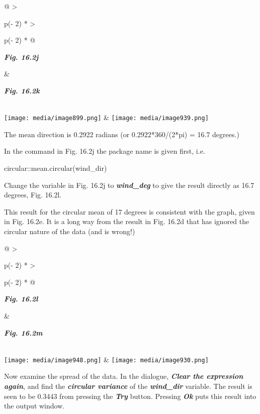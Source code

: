 \documentclass[
  letterpaper,
  DIV=11,
  numbers=noendperiod]{scrreprt}
\begin{document}
\begin{longtable}[]{@{}
  >{\raggedright\arraybackslash}p{(\columnwidth - 2\tabcolsep) * }
  >{\raggedright\arraybackslash}p{(\columnwidth - 2\tabcolsep) * }@{}}
\toprule\noalign{}
\begin{minipage}[b]{\linewidth}\raggedright
\textbf{\emph{Fig. 16.2j}}
\end{minipage} & \begin{minipage}[b]{\linewidth}\raggedright
\textbf{\emph{Fig. 16.2k}}
\end{minipage} \\
\midrule\noalign{}
\endhead
\bottomrule\noalign{}
\endlastfoot
\texttt{[image: media/image899.png]} &
\texttt{[image: media/image939.png]} \\
\end{longtable}

The mean direction is 0.2922 radians (or 0.2922*360/(2*pi) = 16.7
degrees.)

In the command in Fig. 16.2j the package name is given first, i.e.

circular::mean.circular(wind\_dir)

Change the variable in Fig. 16.2j to \textbf{\emph{wind\_deg}} to give
the result directly as 16.7 degrees, Fig. 16.2l.

This result for the circular mean of 17 degrees is consistent with the
graph, given in Fig. 16.2e. It is a long way from the result in Fig.
16.2d that has ignored the circular nature of the data (and is wrong!)

\begin{longtable}[]{@{}
  >{\raggedright\arraybackslash}p{(\columnwidth - 2\tabcolsep) * }
  >{\raggedright\arraybackslash}p{(\columnwidth - 2\tabcolsep) * }@{}}
\toprule\noalign{}
\begin{minipage}[b]{\linewidth}\raggedright
\textbf{\emph{Fig. 16.2l}}
\end{minipage} & \begin{minipage}[b]{\linewidth}\raggedright
\textbf{\emph{Fig. 16.2m}}
\end{minipage} \\
\midrule\noalign{}
\endhead
\bottomrule\noalign{}
\endlastfoot
\texttt{[image: media/image948.png]} &
\texttt{[image: media/image930.png]} \\
\end{longtable}

Now examine the spread of the data. In the dialogue, \textbf{\emph{Clear
the expression again}}, and find the \textbf{\emph{circular variance}}
of the \textbf{\emph{wind\_dir}} variable. The result is seen to be
0.3443 from pressing the \textbf{\emph{Try}} button. Pressing
\textbf{\emph{Ok}} puts this result into the output window.
\end{document}
